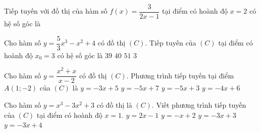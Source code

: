 \begin{ex}%
	Tiếp tuyến với đồ thị của hàm số $f(x) = \dfrac{3}{{2x - 1}}$ tại điểm  có hoành độ $x = 2$ có hệ số góc là \\
\end{ex}

\begin{ex}%
	Cho hàm số $y=\dfrac{5}{3}{x^3}-x^2+4$ có đồ thị  $(C)$. Tiếp tuyến của $(C)$ tại điểm có hoành độ $x_0=3$ có hệ số góc là
	\choice 
		 {\True $39$}
		 {$40$}
		 {$51$}
		 {$3$}
\end{ex}

\begin{ex}%
	Cho hàm số $y =\dfrac{x^2 + x}{x - 2}$ có đồ thị $(C)$. Phương trình tiếp tuyến tại điểm $A(1; -2)$ của $(C)$  là
	\choice 
		{$y = -3x + 5$} 
		{$y  = -5x + 7$}
		{\True $y  = -5x + 3$}
		{$y = -4x  + 6$}
\end{ex}

\begin{ex}%
	Cho hàm số $y=x^3-3x^2+3$ có đồ thị là $(C)$. Viết phương  trình tiếp tuyến của $(C)$ tại điểm có hoành độ $x=1$.
	\choice 
		 {$y=2x-1$}
		{$y=-x+2$} 
		 {$y=-3x+3$}
		{\True  $y=-3x+4$}
\end{ex}

